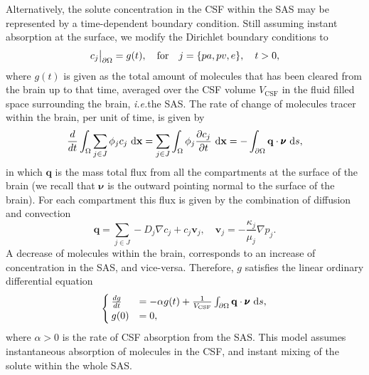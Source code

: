 \documentclass[10pt]{article}
\newcommand\restr[2]{{%
\left.\kern-\nulldelimiterspace %
#1 %
\vphantom{\big|} %
\right|_{#2} %
}}
\newcommand{\ie}{\emph{i.e.}\;}
\newcommand{\1}{^{(1)}}
\newcommand{\2}{^{(2)}}
\newcommand*{\dd}{\mathop{\kern0pt\mathrm{d}}\!{}}
\newcommand {\x}   {\mathbf{x}}
\begin{document}
Alternatively, the solute concentration in the CSF within the SAS may be represented by a time-dependent boundary condition. Still assuming instant absorption at the surface, we modify the Dirichlet boundary conditions to
\begin{equation}
     \restr{c_j}{\partial \Omega} =  g(t),\quad \text{for}\quad j=\{pa,pv,e \}, \quad t >0,
    \label{eq:inulin-inhomogeneous-dirichlet}
\end{equation}
where $ g(t)$ is given as the total amount of molecules that has been cleared from the brain up to that time, averaged over the CSF volume $ V_\text{CSF} $ in the fluid filled space surrounding the brain, \ie the SAS. The rate of change of molecules tracer within the brain, per unit of time, is given by
\begin{equation}
    \frac{d}{dt}\int_{\Omega} \sum_{j\in J} \phi_j c_j \,\dd \x= \sum_{j\in J} \int_{\Omega} \phi_j \frac{\partial c_j}{\partial t} \,\dd \x=   - \int_{\partial \Omega}  \mathbf{q} \cdot \pmb{\nu} \,\dd s  ,
\end{equation}
in which $\mathbf{q}$ is the mass total flux from all the compartments at the surface of the brain (we recall that $\pmb{\nu}$ is the outward pointing normal to the surface of the brain). 
For each compartment this flux is given by the combination of diffusion and convection 
\[
    \mathbf{q} =  \sum_{j\in J}  - D_j\nabla c_j + c_j \mathbf{v}_j,\quad \mathbf{v}_j = -\frac{\kappa_j}{\mu_j}\nabla p_j.   
\]
A decrease of molecules within the brain, corresponds to an increase of concentration in the SAS, and vice-versa. Therefore, $g$ satisfies the linear ordinary differential equation 
\begin{equation}
    \begin{cases}
        \frac{dg}{dt} &= - \alpha g(t)  + \frac{1}{V_\text{CSF}} \int_{\partial \Omega}  \mathbf{q} \cdot\pmb{\nu}\,\dd s, \\
        g(0) &= 0,
    \end{cases}
    \label{eq:inulin-boundary-inhomogeneous}
\end{equation}
where $\alpha > 0$ is the rate of CSF absorption from the SAS. 
This model assumes instantaneous absorption of molecules in the CSF, and instant mixing of the solute within the whole SAS. %
\end{document}
